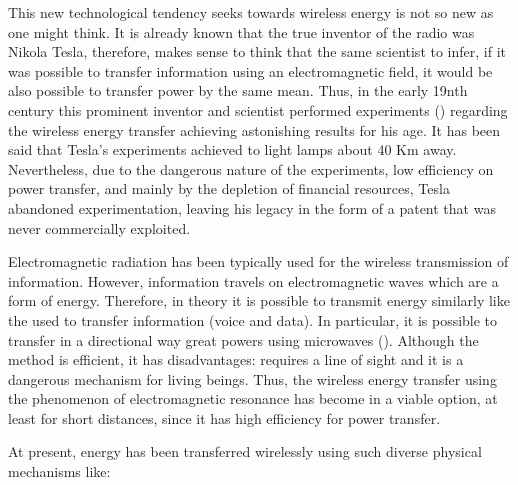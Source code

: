 \documentclass{intech}
\begin{document}
This new technological tendency seeks towards wireless energy is not so new as one might think. It is already known that the true inventor of the radio was Nikola Tesla, therefore, makes sense to think that the same scientist to infer, if it was possible to transfer information using an electromagnetic field, it would be also possible to transfer power by the same mean. Thus, in the early 19nth century this prominent inventor and scientist performed experiments (\cite{RES20}) regarding the wireless energy transfer achieving astonishing results for his age. It has been said that Tesla's experiments achieved to light lamps about 40 Km away. Nevertheless, due to the dangerous nature of the experiments, low efficiency on power transfer, and mainly by the depletion of financial resources, Tesla abandoned experimentation, leaving his legacy in the form of a patent that was never commercially exploited.

Electromagnetic radiation has been typically used for the wireless transmission of information. However, information travels on electromagnetic waves which are a form of energy. Therefore, in theory it is possible to transmit energy similarly like the used to transfer information (voice and data). In particular, it is possible to transfer in a directional way great powers using microwaves (\cite{RES22}). Although the method is efficient, it has disadvantages: requires a line of sight and it is a dangerous mechanism for living beings. Thus, the wireless energy transfer using the phenomenon of electromagnetic resonance has become in a viable option, at least for short distances, since it has high efficiency for power transfer.

At present, energy has been transferred wirelessly using such diverse physical mechanisms like:
\end{document}
